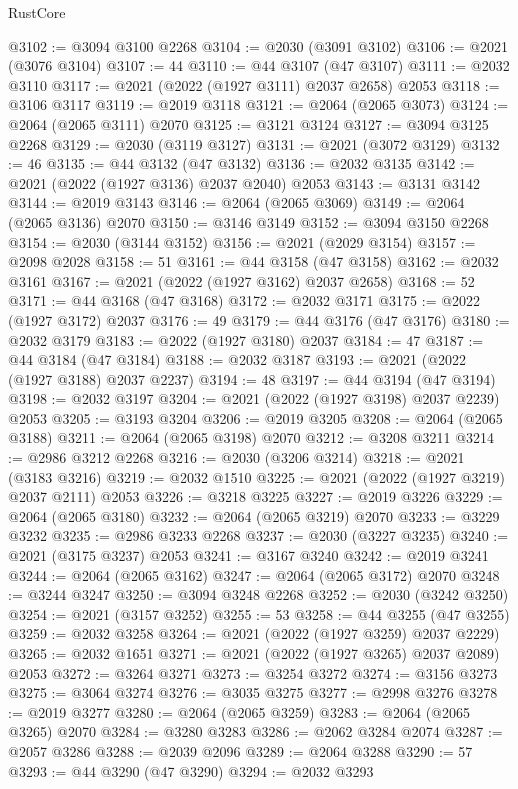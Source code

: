 \begin{lexlean}{RustCore}
\begin{coremodule}
@3102 := @3094 @3100 @2268
@3104 := @2030 (@3091 @3102)
@3106 := @2021 (@3076 @3104)
@3107 := 44
@3110 := @44 @3107 (@47 @3107)
@3111 := @2032 @3110
@3117 := @2021 (@2022 (@1927 @3111) @2037 @2658) @2053
@3118 := @3106 @3117
@3119 := @2019 @3118
@3121 := @2064 (@2065 @3073)
@3124 := @2064 (@2065 @3111) @2070
@3125 := @3121 @3124
@3127 := @3094 @3125 @2268
@3129 := @2030 (@3119 @3127)
@3131 := @2021 (@3072 @3129)
@3132 := 46
@3135 := @44 @3132 (@47 @3132)
@3136 := @2032 @3135
@3142 := @2021 (@2022 (@1927 @3136) @2037 @2040) @2053
@3143 := @3131 @3142
@3144 := @2019 @3143
@3146 := @2064 (@2065 @3069)
@3149 := @2064 (@2065 @3136) @2070
@3150 := @3146 @3149
@3152 := @3094 @3150 @2268
@3154 := @2030 (@3144 @3152)
@3156 := @2021 (@2029 @3154)
@3157 := @2098 @2028
@3158 := 51
@3161 := @44 @3158 (@47 @3158)
@3162 := @2032 @3161
@3167 := @2021 (@2022 (@1927 @3162) @2037 @2658)
@3168 := 52
@3171 := @44 @3168 (@47 @3168)
@3172 := @2032 @3171
@3175 := @2022 (@1927 @3172) @2037
@3176 := 49
@3179 := @44 @3176 (@47 @3176)
@3180 := @2032 @3179
@3183 := @2022 (@1927 @3180) @2037
@3184 := 47
@3187 := @44 @3184 (@47 @3184)
@3188 := @2032 @3187
@3193 := @2021 (@2022 (@1927 @3188) @2037 @2237)
@3194 := 48
@3197 := @44 @3194 (@47 @3194)
@3198 := @2032 @3197
@3204 := @2021 (@2022 (@1927 @3198) @2037 @2239) @2053
@3205 := @3193 @3204
@3206 := @2019 @3205
@3208 := @2064 (@2065 @3188)
@3211 := @2064 (@2065 @3198) @2070
@3212 := @3208 @3211
@3214 := @2986 @3212 @2268
@3216 := @2030 (@3206 @3214)
@3218 := @2021 (@3183 @3216)
@3219 := @2032 @1510
@3225 := @2021 (@2022 (@1927 @3219) @2037 @2111) @2053
@3226 := @3218 @3225
@3227 := @2019 @3226
@3229 := @2064 (@2065 @3180)
@3232 := @2064 (@2065 @3219) @2070
@3233 := @3229 @3232
@3235 := @2986 @3233 @2268
@3237 := @2030 (@3227 @3235)
@3240 := @2021 (@3175 @3237) @2053
@3241 := @3167 @3240
@3242 := @2019 @3241
@3244 := @2064 (@2065 @3162)
@3247 := @2064 (@2065 @3172) @2070
@3248 := @3244 @3247
@3250 := @3094 @3248 @2268
@3252 := @2030 (@3242 @3250)
@3254 := @2021 (@3157 @3252)
@3255 := 53
@3258 := @44 @3255 (@47 @3255)
@3259 := @2032 @3258
@3264 := @2021 (@2022 (@1927 @3259) @2037 @2229)
@3265 := @2032 @1651
@3271 := @2021 (@2022 (@1927 @3265) @2037 @2089) @2053
@3272 := @3264 @3271
@3273 := @3254 @3272
@3274 := @3156 @3273
@3275 := @3064 @3274
@3276 := @3035 @3275
@3277 := @2998 @3276
@3278 := @2019 @3277
@3280 := @2064 (@2065 @3259)
@3283 := @2064 (@2065 @3265) @2070
@3284 := @3280 @3283
@3286 := @2062 @3284 @2074
@3287 := @2057 @3286
@3288 := @2039 @2096
@3289 := @2064 @3288
@3290 := 57
@3293 := @44 @3290 (@47 @3290)
@3294 := @2032 @3293

\end{coremodule}
\end{lexlean}
